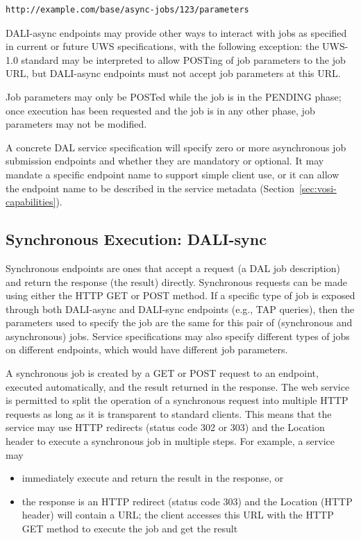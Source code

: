 \documentclass[11pt,letter]{ivoa}
\begin{document}
\begin{verbatim}
http://example.com/base/async-jobs/123/parameters
\end{verbatim}

DALI-async endpoints may provide other ways to interact with jobs as specified
in current or future UWS specifications, with the following exception: the
UWS-1.0 standard may be interpreted to allow POSTing of job parameters to the
job URL, but DALI-async endpoints must not accept job parameters at this URL.

Job parameters may only be POSTed while the job is in the PENDING phase; once
execution has been requested and the job is in any other phase, job parameters
may not be modified.

A concrete DAL service specification will specify zero or more asynchronous job
submission endpoints and whether they are mandatory or optional. It may mandate
a specific endpoint name to support simple client use, or it can allow the
endpoint name to be described in the service metadata (Section~\ref{sec:vosi-capabilities}).

\subsection{Synchronous Execution: DALI-sync}
\label{sec:dali-sync}
Synchronous endpoints are ones that accept a request (a DAL job
description) and return the response (the result) directly. Synchronous requests
can be made using either the HTTP GET or POST method. If a specific type of job
is exposed through both DALI-async and DALI-sync endpoints (e.g., TAP queries),
then the parameters used to specify the job are the same for  this pair of
(synchronous and asynchronous) jobs. Service specifications may also specify
different types of jobs on different endpoints, which would have different job
parameters.

A synchronous job is created by a GET or POST request to an endpoint,
executed automatically, and the result returned in the response. The web service
is permitted to split the operation of a synchronous request into multiple HTTP
requests as long as it is transparent to standard clients. This means that the
service may use HTTP redirects (status code 302 or 303) and the Location header
to execute a synchronous job in multiple steps. For example, a service may

\begin{itemize}
\item immediately execute and return the result in the response, or
\item the response is an HTTP redirect (status code 303) and the Location (HTTP
header) will contain a URL; the client accesses this URL with the HTTP GET
method to execute the job and get the result
\end{itemize}
\end{document}
